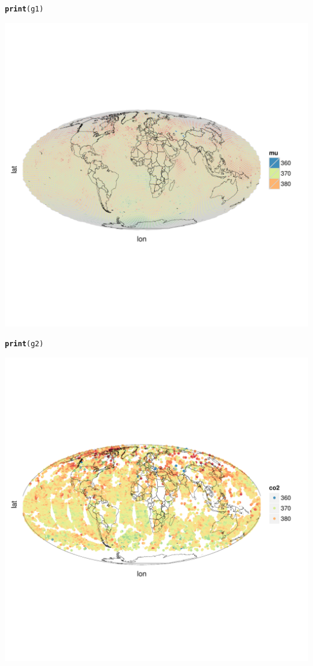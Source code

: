 \documentclass{article}\usepackage[]{graphicx}\usepackage[]{color}
\makeatletter
\def\maxwidth{ %
  \ifdim\Gin@nat@width>\linewidth
    \linewidth
  \else
    \Gin@nat@width
  \fi
}
\newcommand{\hlstd}[1]{\textcolor[rgb]{0.345,0.345,0.345}{#1}}%
\newcommand{\hlkwd}[1]{\textcolor[rgb]{0.737,0.353,0.396}{\textbf{#1}}}%
\newenvironment{kframe}{%
 \def\at@end@of@kframe{}%
 \ifinner\ifhmode%
  \def\at@end@of@kframe{\end{minipage}}%
  \begin{minipage}{\columnwidth}%
 \fi\fi%
 \def\FrameCommand##1{\hskip\@totalleftmargin \hskip-\fboxsep
 \colorbox{shadecolor}{##1}\hskip-\fboxsep
     \hskip-\linewidth \hskip-\@totalleftmargin \hskip\columnwidth}%
 \MakeFramed {\advance\hsize-\width
   \@totalleftmargin\z@ \linewidth\hsize
   \@setminipage}}%
 {\par\unskip\endMakeFramed%
 \at@end@of@kframe}
\newenvironment{knitrout}{}{} %
\makeatother
\begin{document}
\begin{knitrout}
\begin{kframe}
\begin{alltt}
\hlkwd{print}\hlstd{(g1)}
\end{alltt}
\end{kframe}
\includegraphics[width=\maxwidth]{figure/unnamed-chunk-2-2} 
\begin{kframe}\begin{alltt}
\hlkwd{print}\hlstd{(g2)}
\end{alltt}
\end{kframe}
\includegraphics[width=\maxwidth]{figure/unnamed-chunk-2-3} 

\end{knitrout}
\end{document}
